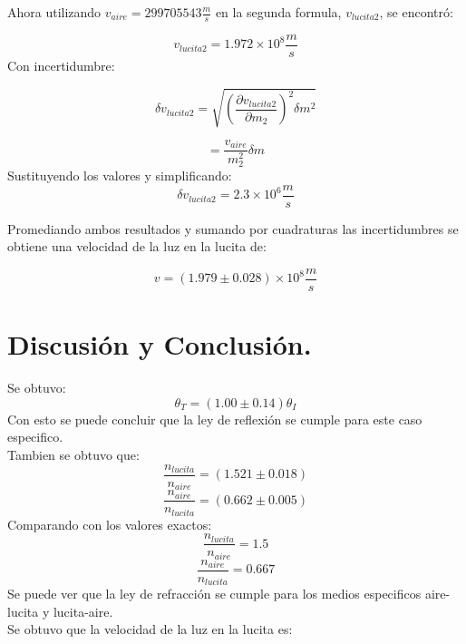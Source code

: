 \documentclass[DIV=calc, paper=a4, fontsize=11pt]{scrartcl}
\begin{document}
Ahora utilizando $v_{aire} = 299705543 \frac{m}{s}$ en la segunda formula, $v_{lucita2}$, se encontró:


\begin{equation*}
    v_{lucita2} = 1.972 \times 10^{8} \frac{m}{s}
\end{equation*}
Con incertidumbre:

\begin{equation*}
    \delta v_{lucita2} = \sqrt{\left(\frac{\partial v_{lucita2}}{\partial m_{2}}\right)^2\delta m^2} 
\end{equation*}

\begin{equation*}
    = \frac{v_{aire}}{m_{2}^2} \delta m
\end{equation*}
Sustituyendo los valores y simplificando:
\begin{equation*}
    \delta v_{lucita2}= 2.3 \times 10^{6} \frac{m}{s}
\end{equation*}

Promediando ambos resultados y sumando por cuadraturas las incertidumbres se obtiene una velocidad de la luz en la lucita de:

\begin{equation*}
    v= (1.979 \pm 0.028) \times 10^{8} \frac{m}{s}
\end{equation*}


\section*{\textcolor{carmine}{Discusión y Conclusión.}}
\nocite{*}
Se obtuvo:
\begin{equation*}
   \theta_{T}=(1.00\pm0.14)\theta_{I}
\end{equation*}
Con esto se puede concluir que la ley de reflexión se cumple para este caso especifico.
\\
Tambien se obtuvo que:
$$ \frac{n_{lucita}}{n_{aire}}= (1.521 \pm 0.018)$$
$$ \frac{n_{aire}}{n_{lucita}}= (0.662 \pm 0.005)$$
Comparando con los valores exactos: %
$$ \frac{n_{lucita}}{n_{aire}}= 1.5 $$
$$ \frac{n_{aire}}{n_{lucita}}= 0.667 $$
Se puede ver que la ley de refracción se cumple para los medios especificos aire-lucita y lucita-aire.
\\
Se obtuvo que la velocidad de la luz en la lucita es:
\end{document}
